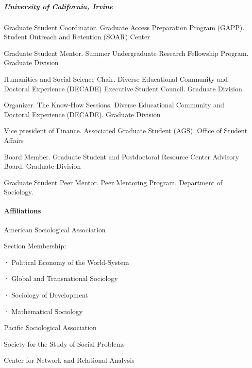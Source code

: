 \documentclass[10pt,]{article}
\let\oldparagraph\paragraph
\renewcommand{\paragraph}[1]{\oldparagraph{#1}\mbox{}}
\let\oldsubparagraph\subparagraph
\renewcommand{\subparagraph}[1]{\oldsubparagraph{#1}\mbox{}}
\renewenvironment{itemize}{
  \begin{list}{}{
    \setlength{\leftmargin}{1.5em}
  }
}{
  \end{list}
}
\begin{document}
\hypertarget{university-of-california-irvine}{%
\subparagraph{University of California,
Irvine}\label{university-of-california-irvine}}

\begin{itemize}
\item
  Graduate Student Coordinator. Graduate Access Preparation Program
  (GAPP). Student Outreach and Retention (SOAR) Center
\item
  Graduate Student Mentor. Summer Undergraduate Research Fellowship
  Program. Graduate Division
\item
  Humanities and Social Science Chair. Diverse Educational Community and
  Doctoral Experience (DECADE) Executive Student Council. Graduate
  Division
\item
  Organizer. The Know-How Sessions. Diverse Educational Community and
  Doctoral Experience (DECADE). Graduate Division
\item
  Vice president of Finance. Associated Graduate Student (AGS). Office
  of Student Affairs
\item
  Board Member. Graduate Student and Postdoctoral Resource Center
  Advisory Board. Graduate Division
\item
  Graduate Student Peer Mentor. Peer Mentoring Program. Department of
  Sociology.
\end{itemize}

\hypertarget{affiliations}{%
\paragraph{Affiliations}\label{affiliations}}

\begin{itemize}
\item
  American Sociological Association

  \begin{itemize}
  \item
    Section Membership:

    \begin{itemize}
    \item
      · Political Economy of the World-System
    \item
      · Global and Transnational Sociology
    \item
      · Sociology of Development
    \item
      · Mathematical Sociology
    \end{itemize}
  \end{itemize}
\item
  Pacific Sociological Association
\item
  Society for the Study of Social Problems
\item
  Center for Network and Relational Analysis
\end{itemize}
\end{document}
